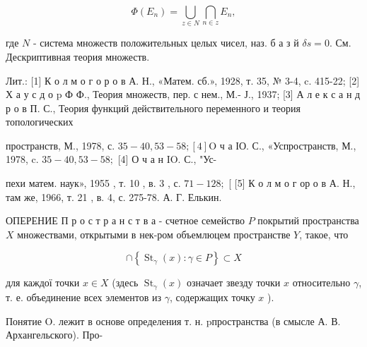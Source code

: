 \documentclass[10pt]{article}
\begin{document}
\[

\Phi\left(E_{n}\right)=\bigcup_{z \in N} \bigcap_{n \in z} E_{n},

\]



где $N$ - система множеств положительных целых чисел, наз. б а з й $\delta s=0$. См. Дескриптивная теория множеств.



Лит.: [1] К о л м о г о р о в А. Н., «Матем. сб.», 1928, т. 35, № 3-4, c. 415-22; [2] Х а у с д о $\mathrm{p}$ Ф Ф., Теория множеств, пер. с нем., М.- Ј., 1937; [3] А л е к с а н д р о в П. С., Теория функций действительного переменного и теория топологических

пространств, М., 1978, с. $35-40,53-58 ;[4] \mathrm{O}$ ч а ІО. С., «Успространств, М., 1978, c. $35-40,53-58 ;$ [4] О ч а н IO. С., "Ус-

пехи матем. наук», 1955 , т. 10 , в. 3 , с. $71-128 ;$ [ [5] К о л м о г ор о в А. Н., там же, 1966, т. 21 , в. 4, с. 275-78. А. Г. Елькин.



ОПЕРЕНИЕ П р о с т р а н с т в а - счетное семейство $P$ покрытий пространства $X$ множествами, открытыми в нек-ром объемлюцем пространстве $Y$, такое, что



\[

\cap\left\{\operatorname{St}_{\gamma}(x): \gamma \in P\right\} \subset X

\]



для каждої точки $x \in X$ (здесь $\operatorname{St}_{\gamma}(x)$ означает звезду точки $x$ относительно $\gamma$, т. е. объединение всех элементов из $\gamma$, содержащих точку $x$ ).



Понятие $\mathrm{O}$. лежит в основе определения т. н. pпространства (в смысле А. В. Архангельского). Про-
\end{document}
